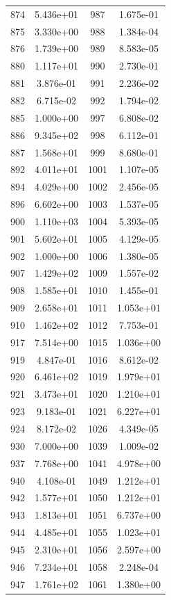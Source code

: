 \documentclass[12pt]{article}
\begin{document}
\begin{longtable}{@{}cccc@{}}
874 & 5.436e+01 & 987 & 1.675e-01 \\
875 & 3.330e+00 & 988 & 1.384e-04 \\
876 & 1.739e+00 & 989 & 8.583e-05 \\
880 & 1.117e+01 & 990 & 2.730e-01 \\
881 & 3.876e-01 & 991 & 2.236e-02 \\
882 & 6.715e-02 & 992 & 1.794e-02 \\
885 & 1.000e+00 & 997 & 6.808e-02 \\
886 & 9.345e+02 & 998 & 6.112e-01 \\
887 & 1.568e+01 & 999 & 8.680e-01 \\
892 & 4.011e+01 & 1001 & 1.107e-05 \\
894 & 4.029e+00 & 1002 & 2.456e-05 \\
896 & 6.602e+00 & 1003 & 1.537e-05 \\
900 & 1.110e+03 & 1004 & 5.393e-05 \\
901 & 5.602e+01 & 1005 & 4.129e-05 \\
902 & 1.000e+00 & 1006 & 1.380e-05 \\
907 & 1.429e+02 & 1009 & 1.557e-02 \\
908 & 1.585e+01 & 1010 & 1.455e-01 \\
909 & 2.658e+01 & 1011 & 1.053e+01 \\
910 & 1.462e+02 & 1012 & 7.753e-01 \\
917 & 7.514e+00 & 1015 & 1.036e+00 \\
919 & 4.847e-01 & 1016 & 8.612e-02 \\
920 & 6.461e+02 & 1019 & 1.979e+01 \\
921 & 3.473e+01 & 1020 & 1.210e+01 \\
923 & 9.183e-01 & 1021 & 6.227e+01 \\
924 & 8.172e-02 & 1026 & 4.349e-05 \\
930 & 7.000e+00 & 1039 & 1.009e-02 \\
937 & 7.768e+00 & 1041 & 4.978e+00 \\
940 & 4.108e-01 & 1049 & 1.212e+01 \\
942 & 1.577e+01 & 1050 & 1.212e+01 \\
943 & 1.813e+01 & 1051 & 6.737e+00 \\
944 & 4.485e+01 & 1055 & 1.023e+01 \\
945 & 2.310e+01 & 1056 & 2.597e+00 \\
946 & 7.234e+01 & 1058 & 2.248e-04 \\
947 & 1.761e+02 & 1061 & 1.380e+00 \\

\end{longtable}
\end{document}
